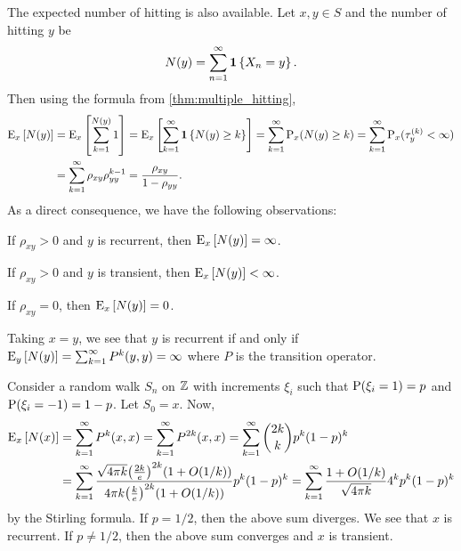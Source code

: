 \begin{remark}
    The expected number of hitting is also available. Let $x,y\in S$ and the number of 
    hitting $y$ be 
    \begin{equation*}
        N(y) = \sum_{n=1}^\infty\one\set{X_n=y}. 
    \end{equation*}
    Then using the formula from \cref{thm:multiple_hitting}, 
    \begin{equation*}
        \begin{split}
            \E_x\sbrc{N(y)} &= \E_x\sbrc{\sum_{k=1}^{N(y)}1} = \E_x\sbrc{\sum_{k=1}^{\infty}\one\set{N(y)\geq k}} 
            = \sum_{k=1}^\infty\P_x(N(y)\geq k) = \sum_{k=1}^\infty\P_x(\tau_y^{(k)}<\infty) \\
            &= \sum_{k=1}^\infty\rho_{xy}\rho_{yy}^{k-1} 
            = \frac{\rho_{xy}}{1-\rho_{yy}}.
        \end{split}
    \end{equation*}
    As a direct consequence, we have the following observations: 
    \begin{thmenum}
        \item If $\rho_{xy}>0$ and $y$ is recurrent, then $\E_x\sbrc{N(y)} = \infty$. 
        \item If $\rho_{xy}>0$ and $y$ is transient, then $\E_x\sbrc{N(y)} < \infty$. 
        \item If $\rho_{xy}=0$, then $\E_x\sbrc{N(y)} = 0$. 
    \end{thmenum}
    Taking $x = y$, we see that $y$ is recurrent if and only if $\E_y\sbrc{N(y)} 
    = \sum_{k=1}^\infty P^k(y,y) = \infty$ where $P$ is the transition operator. 
\end{remark}

\begin{example}
    Consider a random walk $S_n$ on $\Z$ with increments $\xi_i$ such that 
    $\P(\xi_i = 1) = p$ and $\P(\xi_i = -1) = 1-p$. Let $S_0 = x$. Now, 
    \begin{equation*}
        \begin{split}
            \E_x\sbrc{N(x)} &= \sum_{k=1}^\infty P^k(x,x) = \sum_{k=1}^\infty P^{2k}(x,x) 
            = \sum_{k=1}^\infty \binom{2k}{k}p^k(1-p)^k \\
            &= \sum_{k=1}^\infty \frac{\sqrt{4\pi k}\pth{\frac{2k}{e}}^{2k}(1+O(1/k))}{4\pi k \pth{\frac{k}{e}}^{2k}(1+O(1/k))}p^k(1-p)^k 
            = \sum_{k=1}^\infty \frac{1+O(1/k)}{\sqrt{4\pi k}}4^kp^k(1-p)^k
        \end{split}
    \end{equation*} 
    by the Stirling formula. If $p = 1/2$, then the above sum diverges. We 
    see that $x$ is recurrent. If $p\neq 1/2$, then the above sum converges 
    and $x$ is transient. 
\end{example}

